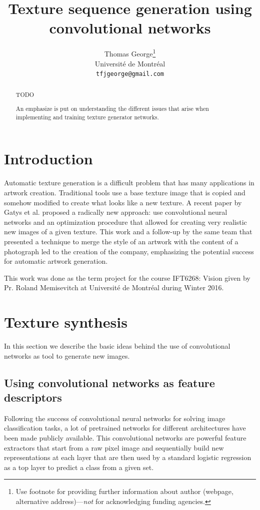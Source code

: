 \documentclass{article}
\title{Texture sequence generation using convolutional networks}
\author{
  Thomas George\thanks{Use footnote for providing further
    information about author (webpage, alternative
    address)---\emph{not} for acknowledging funding agencies.} \\
  Université de Montréal\\
  \texttt{tfjgeorge@gmail.com} \\
}
\begin{document}

\maketitle

\begin{abstract}
  TODO
  
  An emphasize is put on understanding the different issues that arise when implementing and training texture generator networks.
\end{abstract}

\section{Introduction}

Automatic texture generation is a difficult problem that has many applications in artwork creation. Traditional tools use a base texture image that is copied and somehow modified to create what looks like a new texture. A recent paper by Gatys et al. \cite{gatys2015neural} \cite{gatys2015texture} proposed a radically new approach: use convolutional neural networks and an optimization procedure that allowed for creating very realistic new images of a given texture. This work and a follow-up by the same team that presented a technique to merge the style of an artwork with the content of a photograph led to the creation of the company, emphasizing the potential success for automatic artwork generation.

This work was done as the term project for the course IFT6268: Vision given by Pr. Roland Memisevitch at Université de Montréal during Winter 2016.

\section{Texture synthesis}

In this section we describe the basic ideas behind the use of convolutional networks as tool to generate new images.

\subsection{Using convolutional networks as feature descriptors}

Following the success of convolutional neural networks for solving image classification tasks, a lot of pretrained networks for different architectures have been made publicly available. This convolutional networks are powerful feature extractors that start from a raw pixel image and sequentially build new representations at each layer that are then used by a standard logistic regression as a top layer to predict a class from a given set.
\end{document}
